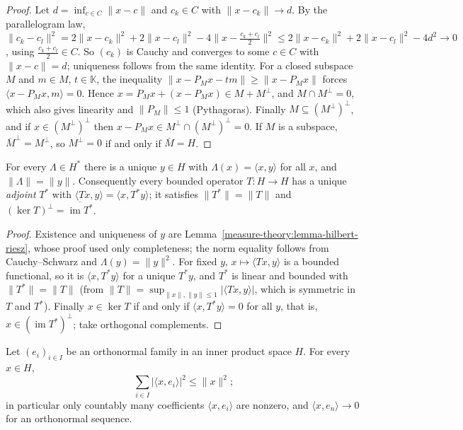 \begin{proof}
Let $d = \inf_{c \in C}\|x - c\|$ and $c_k \in C$ with $\|x - c_k\| \to d$. By the parallelogram law,
$\|c_k - c_l\|^2 = 2\|x - c_k\|^2 + 2\|x - c_l\|^2 - 4\|x - \tfrac{c_k + c_l}{2}\|^2 \leq 2\|x - c_k\|^2 + 2\|x - c_l\|^2 - 4d^2 \to 0$, using $\tfrac{c_k+c_l}{2} \in C$. So $(c_k)$ is Cauchy and converges to some
$c \in C$ with $\|x - c\| = d$; uniqueness follows from the same identity. For a closed subspace $M$ and $m \in M$, $t \in \mathbb{K}$, the inequality $\|x - P_Mx - tm\| \geq \|x - P_Mx\|$ forces
$\langle x - P_Mx, m \rangle = 0$. Hence $x = P_Mx + (x - P_Mx) \in M + M^\perp$, and $M \cap M^\perp = 0$, which also gives linearity and $\|P_M\| \leq 1$ (Pythagoras). Finally $M \subseteq (M^\perp)^\perp$, and
if $x \in (M^\perp)^\perp$ then $x - P_Mx \in M^\perp \cap (M^\perp)^\perp = 0$. If $M$ is a subspace, $\overline{M}^\perp = M^\perp$, so $M^\perp = 0$ if and only if $\overline{M} = H$.
\end{proof}

\begin{theorem}\label{functional-analysis:theorem-riesz-representation}
For every $\Lambda \in H^*$ there is a unique $y \in H$ with $\Lambda(x) = \langle x, y \rangle$ for all $x$, and $\|\Lambda\| = \|y\|$. Consequently every bounded operator $T \colon H \to H$ has a unique
\emph{adjoint} $T^*$ with $\langle Tx, y \rangle = \langle x, T^*y \rangle$; it satisfies $\|T^*\| = \|T\|$ and $(\ker T)^\perp = \overline{\operatorname{im}T^*}$.
\end{theorem}

\begin{proof}
Existence and uniqueness of $y$ are Lemma~\ref{measure-theory:lemma-hilbert-riesz}, whose proof used only completeness; the norm equality follows from Cauchy--Schwarz and $\Lambda(y) = \|y\|^2$. For fixed
$y$, $x \mapsto \langle Tx, y \rangle$ is a bounded functional, so it is $\langle x, T^*y \rangle$ for a unique $T^*y$, and $T^*$ is linear and bounded with $\|T^*\| = \|T\|$ (from
$\|T\| = \sup_{\|x\|, \|y\| \leq 1}|\langle Tx, y \rangle|$, which is symmetric in $T$ and $T^*$). Finally $x \in \ker T$ if and only if $\langle x, T^*y \rangle = 0$ for all $y$, that is, $x \in (\operatorname{im}T^*)^\perp$; take orthogonal
complements.
\end{proof}

\begin{proposition}\label{functional-analysis:proposition-bessel}
Let $(e_i)_{i \in I}$ be an orthonormal family in an inner product space $H$. For every $x \in H$,
\[
\sum_{i \in I}|\langle x, e_i \rangle|^2 \leq \|x\|^2;
\]
in particular only countably many coefficients $\langle x, e_i\rangle$ are nonzero, and $\langle x, e_n\rangle \to 0$ for an orthonormal sequence.
\end{proposition}

